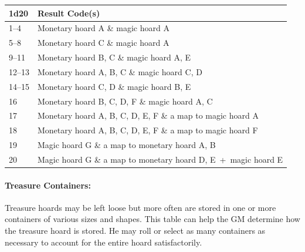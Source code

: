 \begin{multicols}{2}
\begin{minipage}{\columnwidth}
\end{minipage}

\noindent
\begin{minipage}{\columnwidth}

\label{combinedhoardtype}
\noindent
\begin{tabular}{|p{}|p{}|}
\hline
1d20	& Result Code(s) \\
\hline\hline
\rowcolor[gray]{.9}1--4	& Monetary hoard A \& magic hoard A \\
5--8	& Monetary hoard C \& magic hoard A \\
\rowcolor[gray]{.9}9--11	& Monetary hoard B, C \& magic hoard A, E \\
12--13	& Monetary hoard A, B, C \& magic hoard C, D \\
\rowcolor[gray]{.9}14--15	& Monetary hoard C, D \& magic hoard B, E \\
16	& Monetary hoard B, C, D, F \& magic hoard A, C \\
\rowcolor[gray]{.9}17	& Monetary hoard A, B, C, D, E, F \& a map to magic hoard A \\
18	& Monetary hoard A, B, C, D, E, F \& a map to magic hoard F \\
\rowcolor[gray]{.9}19	& Magic hoard G \& a map to monetary hoard A, B \\
20	& Magic hoard G \& a map to monetary hoard D, E~+~magic hoard E \\
\hline
\end{tabular}

\end{minipage}

\paragraph{Treasure Containers:} Treasure hoards may be left loose but more often are stored in one or more containers of various sizes and shapes.  This table can help the GM determine how the treasure hoard is stored.  He may roll or select as many containers as necessary to account for the entire hoard satisfactorily.

\noindent
\begin{minipage}{\columnwidth}


\end{minipage}
\end{multicols}
